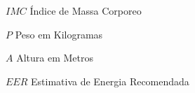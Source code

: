 \begin{simbolos}
	\item [$ IMC $] Índice de Massa Corporeo
	\item [$ P $] Peso em Kilogramas 
	\item [$ A $] Altura em Metros
	\item [$ EER $] Estimativa de Energia Recomendada
\end{simbolos}
